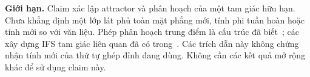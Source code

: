 \documentclass[12pt,a4paper]{article}
\begin{document}
\textbf{Giới hạn.} Claim xác lập attractor và phân hoạch của một tam giác hữu hạn. Chưa khẳng định một lớp lát phủ toàn mặt phẳng mới, tính phi tuần hoàn hoặc tính mới so với văn liệu. Phép phân hoạch trung điểm là cấu trúc đã biết~\cite{brunck2023medial}; các xây dựng IFS tam giác liên quan đã có trong~\cite{barnsleyvince2014tilings}. Các trích dẫn này không chứng nhận tính mới của thứ tự ghép đỉnh đang dùng. Không cần các kết quả mở rộng khác để sử dụng claim này.



\end{document}
